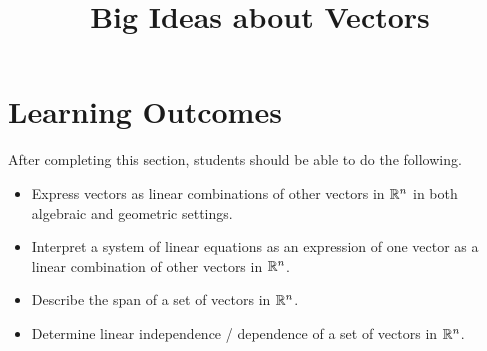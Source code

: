 \documentclass{ximera}
\title{Big Ideas about Vectors}
\begin{document}
\begin{abstract}

\end{abstract}
 
\maketitle
 
\section*{Learning Outcomes}
After completing this section, students should be able to do the following.
 
\begin{itemize}
    \item  Express vectors as linear combinations of other vectors in $\mathbb{R}^n$ in both algebraic and geometric settings.
    \item  Interpret a system of linear equations as an expression of one vector as a linear combination of other vectors in $\mathbb{R}^n$.
    \item Describe the span of a set of vectors in $\mathbb{R}^n$.
    \item Determine linear independence / dependence of a set of vectors in $\mathbb{R}^n$.

 
\end{itemize}

 
\end{document}

